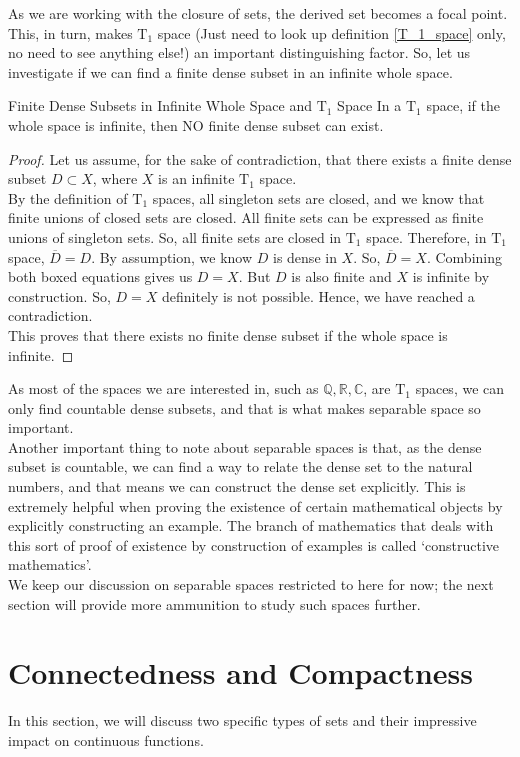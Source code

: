 \noindent As we are working with the closure of sets, the derived set becomes a focal point. This, in turn, makes $\mathrm{T}_1$ space (Just need to look up definition \eqref{T_1_space} only, no need to see anything else!) an important distinguishing factor. So, let us investigate if we can find a finite dense subset in an infinite whole space.
\begin{Theorem}{Finite Dense Subsets in Infinite Whole Space and $\mathrm{T}_1$ Space}
    In a $\mathrm{T}_1$ space, if the whole space is infinite, then NO finite dense subset can exist.
\end{Theorem}
\begin{proof}
    Let us assume, for the sake of contradiction, that there exists a finite dense subset $D\subset X$, where $X$ is an infinite $\mathrm{T}_1$ space.\\
    By the definition of $\mathrm{T}_1$ spaces, all singleton sets are closed, and we know that finite unions of closed sets are closed. All finite sets can be expressed as finite unions of singleton sets. So, all finite sets are closed in $\mathrm{T}_1$ space. Therefore, in $\mathrm{T}_1$ space, $\boxed{\overline{D}=D}$. By assumption, we know $D$ is dense in $X$. So, $\boxed{\overline{D}=X}$. Combining both boxed equations gives us $D=X$. But $D$ is also finite and $X$ is infinite by construction. So, $D=X$ definitely is not possible. Hence, we have reached a contradiction.\\
    This proves that there exists no finite dense subset if the whole space is infinite.
\end{proof}
\noindent As most of the spaces we are interested in, such as $\mathbb{Q, R, C}$, are $\mathrm{T}_1$ spaces, we can only find countable dense subsets, and that is what makes separable space so important.\\
Another important thing to note about separable spaces is that, as the dense subset is countable, we can find a way to relate the dense set to the natural numbers, and that means we can construct the dense set explicitly. This is extremely helpful when proving the existence of certain mathematical objects by explicitly constructing an example. The branch of mathematics that deals with this sort of proof of existence by construction of examples is called `constructive mathematics'.\\
We keep our discussion on separable spaces restricted to here for now; the next section will provide more ammunition to study such spaces further.
\section{Connectedness and Compactness}
In this section, we will discuss two specific types of sets and their impressive impact on continuous functions.

